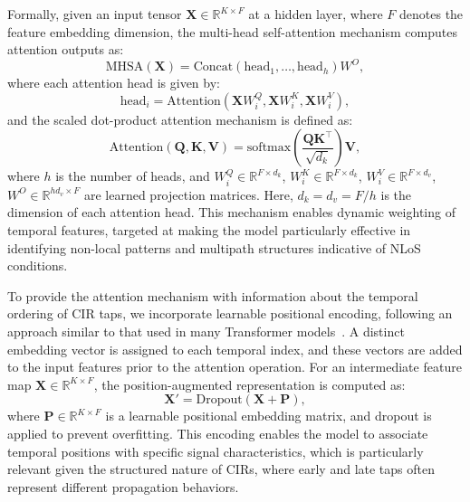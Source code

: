 Formally, given an input tensor $\mathbf{X} \in \mathbb{R}^{K \times F}$ at a hidden layer, where $F$ denotes the feature embedding dimension, the multi-head self-attention mechanism computes attention outputs as:
\begin{equation}
    \text{MHSA}(\mathbf{X}) = \text{Concat}(\text{head}_1, \dots, \text{head}_h) W^O,
\end{equation}
where each attention head is given by:
\begin{equation}
    \text{head}_i = \text{Attention}(\mathbf{X} W_i^Q, \mathbf{X} W_i^K, \mathbf{X} W_i^V),
\end{equation}
and the scaled dot-product attention mechanism is defined as:
\begin{equation}
    \text{Attention}(\mathbf{Q}, \mathbf{K}, \mathbf{V}) = \text{softmax}\left( \frac{\mathbf{Q} \mathbf{K}^\top}{\sqrt{d_k}} \right) \mathbf{V},
\end{equation}
where $h$ is the number of heads, and $W_i^Q \in \mathbb{R}^{F \times d_k}$, $W_i^K \in \mathbb{R}^{F \times d_k}$, $W_i^V \in \mathbb{R}^{F \times d_v}$, $W^O \in \mathbb{R}^{hd_v \times F}$ are learned projection matrices. Here, $d_k = d_v = F/h$ is the dimension of each attention head. This mechanism enables dynamic weighting of temporal features, targeted at making the model particularly effective in identifying non-local patterns and multipath structures indicative of NLoS conditions.

To provide the attention mechanism with information about the temporal ordering of CIR taps, we incorporate learnable positional encoding, following an approach similar to that used in many Transformer models~\cite{2019-bert, 2022-simple-yet}. A distinct embedding vector is assigned to each temporal index, and these vectors are added to the input features prior to the attention operation. For an intermediate feature map $\mathbf{X} \in \mathbb{R}^{K \times F}$, the position-augmented representation is computed as:
\begin{equation}
    \mathbf{X}' = \text{Dropout}(\mathbf{X} + \mathbf{P}),
\end{equation}
where $\mathbf{P} \in \mathbb{R}^{K \times F}$ is a learnable positional embedding matrix, and dropout is applied to prevent overfitting. This encoding enables the model to associate temporal positions with specific signal characteristics, which is particularly relevant given the structured nature of CIRs, where early and late taps often represent different propagation behaviors.

